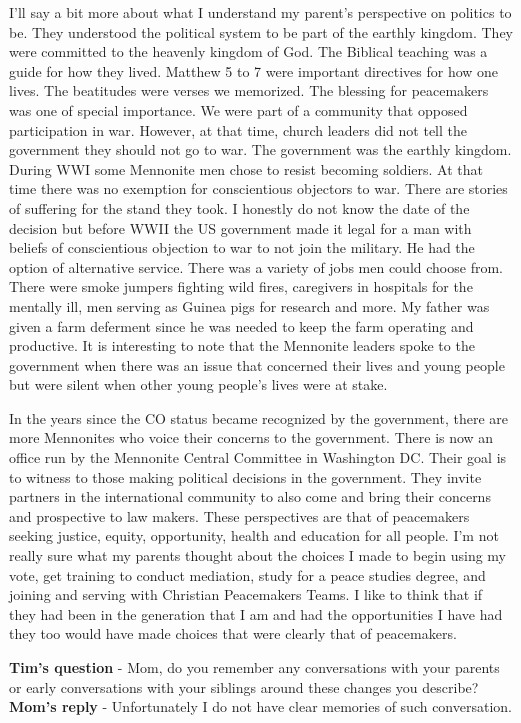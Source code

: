 I'll say a bit more about what I understand my parent's perspective on politics to be.
They understood the political system to be part of the earthly kingdom.
They were committed to the heavenly kingdom of God.
The Biblical teaching was a guide for how they lived.
Matthew 5 to 7 were important directives for how one lives.
The beatitudes were verses we memorized.
The blessing for peacemakers was one of special importance.
We were part of a community that opposed participation in war.
However, at that time, church leaders did not tell the government they should not go to war.
The government was the earthly kingdom.
During WWI some Mennonite men chose to resist becoming soldiers.
At that time there was no exemption for conscientious objectors to war.
There are stories of suffering for the stand they took.
I honestly do not know the date of the decision but before WWII the US government made it legal for a man with beliefs of conscientious objection to war to not join the military.
He had the option of alternative service.
There was a variety of jobs men could choose from.
There were smoke jumpers fighting wild fires, caregivers in hospitals for the mentally ill, men serving as Guinea pigs for research and more.
My father was given a farm deferment since he was needed to keep the farm operating and productive.
It is interesting to note that the Mennonite leaders spoke to the government when there was an issue that concerned their lives and young people but were silent when other young people's lives were at stake.

In the years since the CO status became recognized by the government, there are more Mennonites who voice their concerns to the government.
There is now an office run by the Mennonite Central Committee in Washington DC.
Their goal is to witness to those making political decisions in the government.
They invite partners in the international community to also come and bring their concerns and prospective to law makers.
These perspectives are that of peacemakers seeking justice, equity, opportunity, health and education for all people.
I'm not really sure what my parents thought about the choices I made to begin using my vote, get training to conduct mediation, study for a peace studies degree, and joining and serving with Christian Peacemakers Teams.
I like to think that if they had been in the generation that I am and had the opportunities I have had they too would have made choices that were clearly that of peacemakers.

\textbf{Tim's question} - Mom, do you remember any conversations with your parents or early conversations with your siblings around these changes you describe?
\textbf{Mom's reply} - Unfortunately I do not have clear memories of such conversation.
